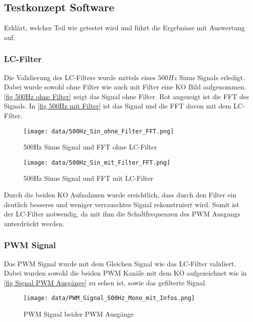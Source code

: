 \subsection{Testkonzept Software}\label{sec:testkonzeptSoftware}

Erklärt, welcher Teil wie getestet wird und führt die Ergebnisse mit Auswertung auf.


\subsubsection*{LC-Filter} \label{sec:Validierung LC-Filter}
Die Validierung des LC-Filters wurde mittels eines $500Hz$ Sinus Signals erledigt. Dabei wurde sowohl ohne Filter wie auch mit Filter eine KO Bild aufgenommen. \autoref{fig 500Hz ohne Filter} zeigt das Signal ohne Filter. Rot angezeigt ist die FFT des Signals. In \autoref{fig 500Hz mit Filter} ist das Signal und die FFT davon mit dem LC-Filter. 


\begin{figure}
\center
\texttt{[image: data/500Hz\_Sin\_ohne\_Filter\_FFT.png]}
\caption{500Hz Sinus Signal und FFT ohne LC-Filter }
\label{fig:500Hz ohne Filter}
\end{figure}

\begin{figure}
\center
\texttt{[image: data/500Hz\_Sin\_mit\_Filter\_FFT.png]}
\caption{500Hz Sinus Signal und FFT mit LC-Filter}
\label{fig:500Hz mit Filter}
\end{figure}

Durch die beiden KO Aufnahmen wurde ersichtlich, dass durch den Filter ein deutlich besseres und weniger verrauschtes Signal rekonstruiert wird. Somit ist der LC-Filter notwendig, da mit ihm die Schaltfrequenzen des PWM Ausgangs unterdrückt werden.


\newpage
\subsubsection{PWM Signal}\label{sec: Validierung PWM Signal}
Das PWM Signal wurde mit dem Gleichen Signal wie das LC-Filter validiert. Dabei wurden sowohl die beiden PWM Kanäle mit dem KO aufgezeichnet wie in \autoref{fig Signal PWM Ausgänge} zu sehen ist, sowie das gefilterte Signal. 

\begin{figure}[ht!]
\center
\texttt{[image: data/PWM\_Signal\_500Hz\_Mono\_mit\_Infos.png]}
\caption{PWM Signal beider PWM Ausgänge}
\label{fig:Signal PWM Ausgänge}
\end{figure}

